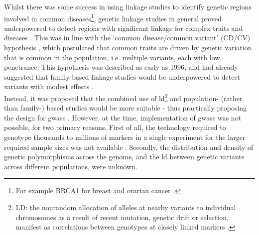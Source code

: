 Whilst there was some success in using linkage studies to identify genetic regions involved in common diseases\footnote{For example BRCA1 for breast and ovarian cancer  \cite{bailey2011linkage, miki1994strong}.},
genetic linkage studies in general proved underpowered to detect regions with significant linkage for complex traits and diseases \cite{bush2012genome, altmuller2001genomewide}. 
This was in line with the `common disease/common variant' (CD/CV) hypothesis \cite{bush2012genome, reich2001allelic}, which postulated that common traits are driven by genetic variation that is common in the population, i.e. multiple variants, each with low penetrance.
This hypothesis was described as early as 1996, and had already suggested that family-based linkage studies would be underpowered to detect variants with modest effects \cite{risch1996future}. \\

\label{sec:ld}
Instead, it was proposed that the combined use of \gls{ld}\footnote{LD: the nonrandom allocation of alleles at nearby variants to individual chromosomes as a result of recent mutation, genetic drift or selection, manifest as correlations between genotypes at closely linked markers \cite{mccarthy2008genome}. 
} and population- (rather than family-) based studies would be more suitable \cite{risch1996future, jorde2000linkage} - thus practically proposing the design for \glspl{gwas} \cite{risch1996future}.
However, at the time, implementation of \glspl{gwas} was not possible, for two primary reasons.
First of all, the technology required to genotype thousands to millions of markers in a single experiment for the larger required sample sizes was not available \cite{risch1996future, visscher2012five}.
Secondly, the distribution and density of genetic polymorphisms across the genome, and the \gls{ld} between genetic variants across different populations, were unknown.\\

